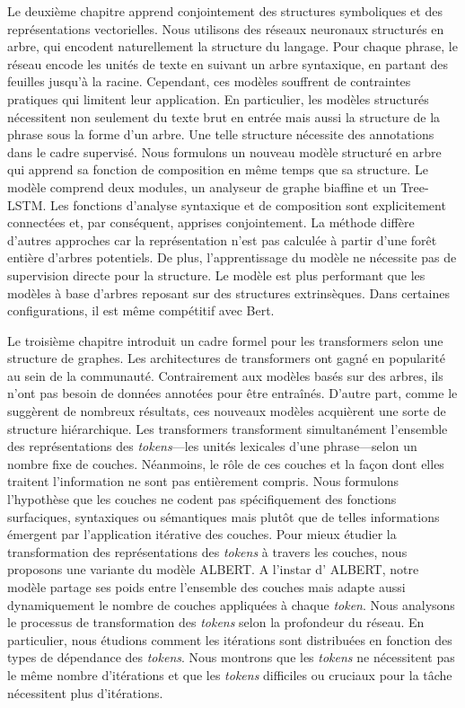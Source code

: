 Le deuxième chapitre apprend conjointement des structures symboliques et des représentations vectorielles. Nous utilisons des réseaux neuronaux structurés en arbre, qui encodent naturellement la structure du langage. Pour chaque phrase, le réseau encode les unités de texte en suivant un arbre syntaxique, en partant des feuilles jusqu'à la racine. Cependant, ces modèles souffrent de contraintes pratiques qui limitent leur application. En particulier, les modèles structurés nécessitent non seulement du texte brut en entrée mais aussi la structure de la phrase sous la forme d'un arbre. Une telle structure nécessite des annotations dans le cadre supervisé. Nous formulons un nouveau modèle structuré en arbre qui apprend sa fonction de composition en même temps que sa structure. Le modèle comprend deux modules, un analyseur de graphe biaffine et un Tree-LSTM. Les fonctions d'analyse syntaxique et de composition sont explicitement connectées et, par conséquent, apprises conjointement. La méthode diffère d’autres approches car la représentation n'est pas calculée à partir d’une forêt entière d'arbres potentiels. De plus, l'apprentissage du modèle ne nécessite pas de supervision directe pour la structure. Le modèle est plus performant que les modèles à base d'arbres reposant sur des structures extrinsèques. Dans certaines configurations, il est même compétitif avec Bert.

Le troisième chapitre introduit un cadre formel pour les transformers selon une structure de graphes. Les architectures de transformers ont gagné en popularité au sein de la communauté. Contrairement aux modèles basés sur des arbres, ils n'ont pas besoin de données annotées pour être entraînés. D'autre part, comme le suggèrent de nombreux résultats, ces nouveaux modèles acquièrent une sorte de structure hiérarchique. Les transformers transforment simultanément l’ensemble des représentations des \textit{tokens}—les unités lexicales d’une phrase—selon un nombre fixe de couches. Néanmoins, le rôle de ces couches et la façon dont elles traitent l'information ne sont pas entièrement compris. Nous formulons l'hypothèse que les couches ne codent pas spécifiquement des fonctions surfaciques, syntaxiques ou sémantiques mais plutôt que de telles informations émergent par l'application itérative des couches. Pour mieux étudier la transformation des représentations des \textit{tokens} à travers les couches, nous proposons une variante du modèle ALBERT. A l’instar d’ ALBERT, notre modèle partage ses poids entre l’ensemble des couches mais adapte aussi dynamiquement le nombre de couches appliquées à chaque \textit{token}. Nous analysons le processus de transformation des \textit{tokens} selon la profondeur du réseau. En particulier, nous étudions comment les itérations sont distribuées en fonction des types de dépendance des \textit{tokens}. Nous montrons que les \textit{tokens} ne nécessitent pas le même nombre d'itérations et que les \textit{tokens} difficiles ou cruciaux pour la tâche nécessitent plus d'itérations.


